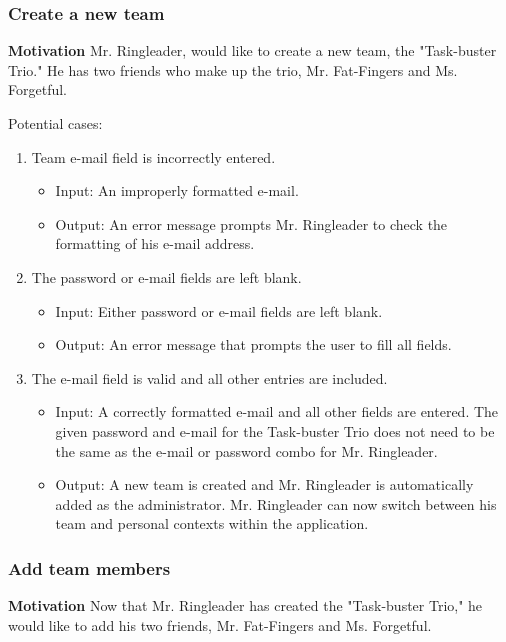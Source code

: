 \documentclass{article}
\begin{document}
\subsubsection{Create a new team}
\textbf{Motivation} Mr. Ringleader, would like to create a new team, the "Task-buster Trio."  He has two friends who make up the trio, Mr. Fat-Fingers and Ms. Forgetful.

Potential cases:
\begin{enumerate}
    \item Team e-mail field is incorrectly entered.
        \begin{itemize}
            \item Input: An improperly formatted e-mail.
            \item Output: An error message prompts Mr. Ringleader to check the formatting of his e-mail address.
        \end{itemize}
    \item The password or e-mail fields are left blank.
        \begin{itemize}
            \item Input: Either password or e-mail fields are left blank.
            \item Output: An error message that prompts the user to fill all fields.
        \end{itemize}
    \item The e-mail field is valid and all other entries are included.
        \begin{itemize}
            \item Input: A correctly formatted e-mail and all other fields are entered.  The given password and e-mail for the Task-buster Trio does not need to be the same as the e-mail or password combo for Mr. Ringleader.
            \item Output: A new team is created and Mr. Ringleader is automatically added as the administrator.
                Mr. Ringleader can now switch between his team and personal contexts within the application.
        \end{itemize}
\end{enumerate}

\subsubsection{Add team members}
\textbf{Motivation} Now that Mr. Ringleader has created the "Task-buster Trio," he would like to add his two friends, Mr. Fat-Fingers and Ms. Forgetful.
\end{document}
